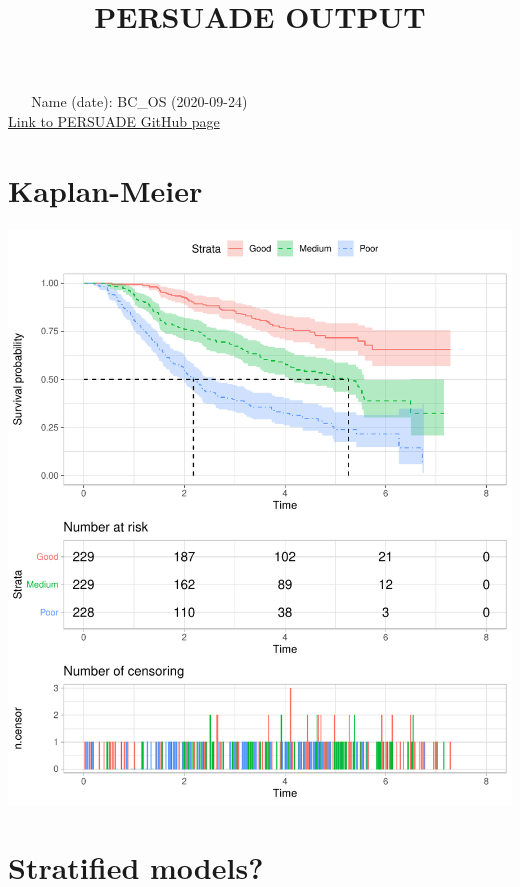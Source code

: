 \documentclass[]{article}
\title{PERSUADE OUTPUT}
\author{}
\date{\vspace{-2.5em}}
\begin{document}
\maketitle

{
\hypersetup{linkcolor=black}
\setcounter{tocdepth}{2}
\tableofcontents
}
~ ~ Name (date): BC\_OS
(2020-09-24)\\[2\baselineskip]\href{https://github.com/Bram-R/PERSUADE}{Link
to PERSUADE GitHub page} \newpage

\section{Kaplan-Meier}\label{kaplan-meier}

\begin{flushleft}\includegraphics{images/plot_KM-1} \end{flushleft}

\newpage

\section{Stratified models?}\label{stratified-models}
\end{document}
